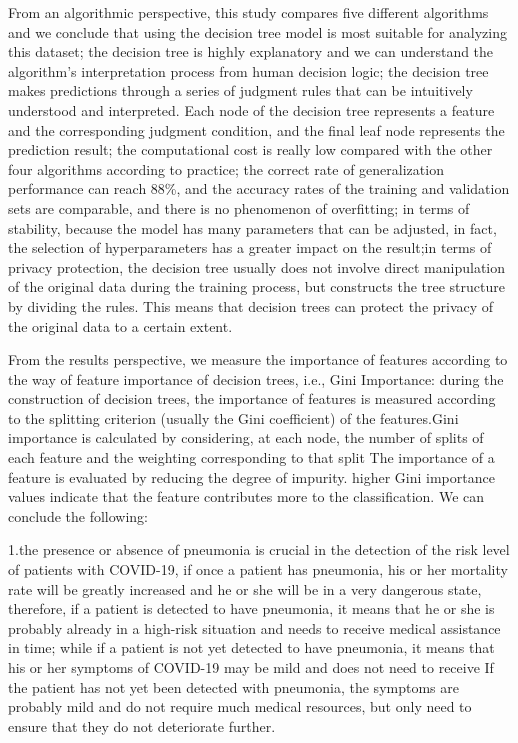 \documentclass[
  journal=medium,
  manuscript=Report,
  year=2023,
  volume=37,
]{cup-journal}
\begin{document}
From an algorithmic perspective, this study compares five different algorithms and we conclude that using the decision tree model is most suitable for analyzing this dataset; the decision tree is highly explanatory and we can understand the algorithm's interpretation process from human decision logic; the decision tree makes predictions through a series of judgment rules that can be intuitively understood and interpreted. Each node of the decision tree represents a feature and the corresponding judgment condition, and the final leaf node represents the prediction result; the computational cost is really low compared with the other four algorithms according to practice; the correct rate of generalization performance can reach 88\%, and the accuracy rates of the training and validation sets are comparable, and there is no phenomenon of overfitting; in terms of stability, because the model has many parameters that can be adjusted, in fact, the selection of hyperparameters has a greater impact on the result;in terms of privacy protection, the decision tree usually does not involve direct manipulation of the original data during the training process, but constructs the tree structure by dividing the rules. This means that decision trees can protect the privacy of the original data to a certain extent.

From the results perspective, we measure the importance of features according to the way of feature importance of decision trees, i.e., Gini Importance: during the construction of decision trees, the importance of features is measured according to the splitting criterion (usually the Gini coefficient) of the features.Gini importance is calculated by considering, at each node, the number of splits of each feature and the weighting corresponding to that split The importance of a feature is evaluated by reducing the degree of impurity. higher Gini importance values indicate that the feature contributes more to the classification. We can conclude the following:

1.the presence or absence of pneumonia is crucial in the detection of the risk level of patients with COVID-19, if once a patient has pneumonia, his or her mortality rate will be greatly increased and he or she will be in a very dangerous state, therefore, if a patient is detected to have pneumonia, it means that he or she is probably already in a high-risk situation and needs to receive medical assistance in time; while if a patient is not yet detected to have pneumonia, it means that his or her symptoms of COVID-19 may be mild and does not need to receive If the patient has not yet been detected with pneumonia, the symptoms are probably mild and do not require much medical resources, but only need to ensure that they do not deteriorate further.
\end{document}
